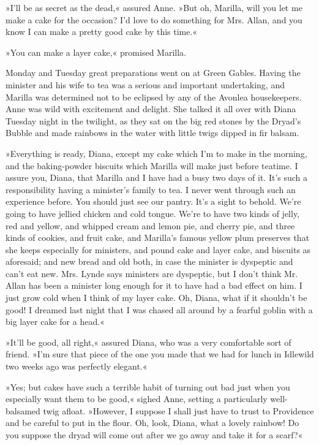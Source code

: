 »I’ll be as secret as the dead,« assured Anne. »But oh, Marilla, will you let me make a cake for the occasion? I’d love to do something for Mrs. Allan, and you know I can make a pretty good cake by this time.«

»You can make a layer cake,« promised Marilla.

Monday and Tuesday great preparations went on at Green Gables. Having the minister and his wife to tea was a serious and important undertaking, and Marilla was determined not to be eclipsed by any of the Avonlea housekeepers. Anne was wild with excitement and delight. She talked it all over with Diana Tuesday night in the twilight, as they sat on the big red stones by the Dryad’s Bubble and made rainbows in the water with little twigs dipped in fir balsam.

»Everything is ready, Diana, except my cake which I’m to make in the morning, and the baking-powder biscuits which Marilla will make just before teatime. I assure you, Diana, that Marilla and I have had a busy two days of it. It’s such a responsibility having a minister’s family to tea. I never went through such an experience before. You should just see our pantry. It’s a sight to behold. We’re going to have jellied chicken and cold tongue. We’re to have two kinds of jelly, red and yellow, and whipped cream and lemon pie, and cherry pie, and three kinds of cookies, and fruit cake, and Marilla’s famous yellow plum preserves that she keeps especially for ministers, and pound cake and layer cake, and biscuits as aforesaid; and new bread and old both, in case the minister is dyspeptic and can’t eat new. Mrs. Lynde says ministers are dyspeptic, but I don’t think Mr. Allan has been a minister long enough for it to have had a bad effect on him. I just grow cold when I think of my layer cake. Oh, Diana, what if it shouldn’t be good! I dreamed last night that I was chased all around by a fearful goblin with a big layer cake for a head.«

»It’ll be good, all right,« assured Diana, who was a very comfortable sort of friend. »I’m sure that piece of the one you made that we had for lunch in Idlewild two weeks ago was perfectly elegant.«

»Yes; but cakes have such a terrible habit of turning out bad just when you especially want them to be good,« sighed Anne, setting a particularly well-balsamed twig afloat. »However, I suppose I shall just have to trust to Providence and be careful to put in the flour. Oh, look, Diana, what a lovely rainbow! Do you suppose the dryad will come out after we go away and take it for a scarf?«

